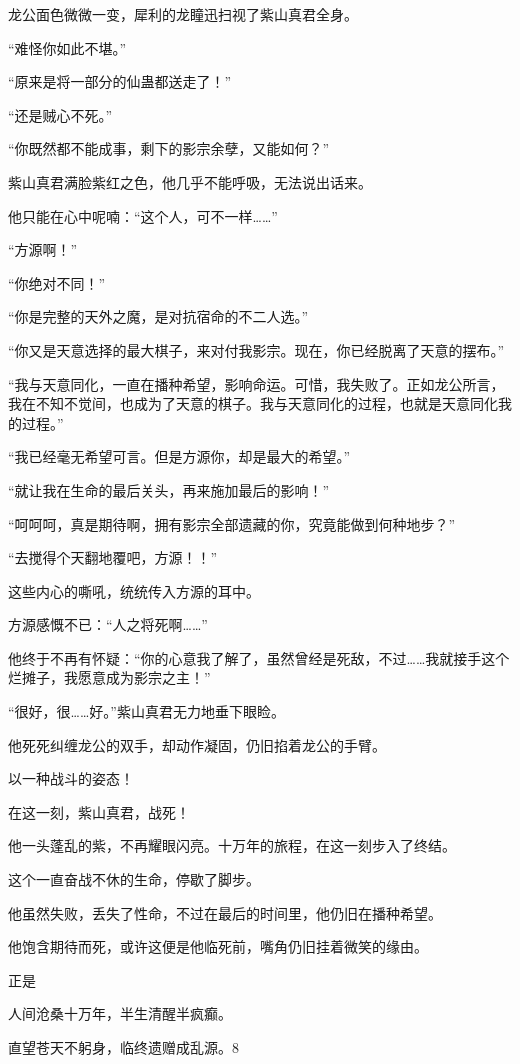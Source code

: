 \begin{this_body}
龙公面色微微一变，犀利的龙瞳迅扫视了紫山真君全身。

“难怪你如此不堪。”

“原来是将一部分的仙蛊都送走了！”

“还是贼心不死。”

“你既然都不能成事，剩下的影宗余孽，又能如何？”

紫山真君满脸紫红之色，他几乎不能呼吸，无法说出话来。

他只能在心中呢喃：“这个人，可不一样……”

“方源啊！”

“你绝对不同！”

“你是完整的天外之魔，是对抗宿命的不二人选。”

“你又是天意选择的最大棋子，来对付我影宗。现在，你已经脱离了天意的摆布。”

“我与天意同化，一直在播种希望，影响命运。可惜，我失败了。正如龙公所言，我在不知不觉间，也成为了天意的棋子。我与天意同化的过程，也就是天意同化我的过程。”

“我已经毫无希望可言。但是方源你，却是最大的希望。”

“就让我在生命的最后关头，再来施加最后的影响！”

“呵呵呵，真是期待啊，拥有影宗全部遗藏的你，究竟能做到何种地步？”

“去搅得个天翻地覆吧，方源！！”

这些内心的嘶吼，统统传入方源的耳中。

方源感慨不已：“人之将死啊……”

他终于不再有怀疑：“你的心意我了解了，虽然曾经是死敌，不过……我就接手这个烂摊子，我愿意成为影宗之主！”

“很好，很……好。”紫山真君无力地垂下眼睑。

他死死纠缠龙公的双手，却动作凝固，仍旧掐着龙公的手臂。

以一种战斗的姿态！

在这一刻，紫山真君，战死！

他一头蓬乱的紫，不再耀眼闪亮。十万年的旅程，在这一刻步入了终结。

这个一直奋战不休的生命，停歇了脚步。

他虽然失败，丢失了性命，不过在最后的时间里，他仍旧在播种希望。

他饱含期待而死，或许这便是他临死前，嘴角仍旧挂着微笑的缘由。

正是

人间沧桑十万年，半生清醒半疯癫。

直望苍天不躬身，临终遗赠成乱源。8

\end{this_body}

